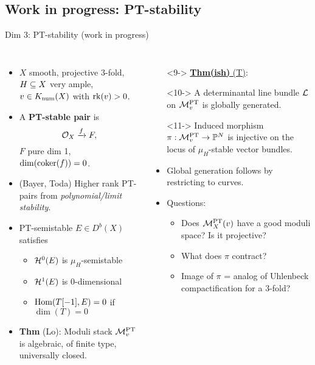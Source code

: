 \documentclass[8pt,handout]{beamer} %
\begin{document}
\subsection{Work in progress: PT-stability}
\begin{frame}{Dim 3: PT-stability (work in progress)}
    \begin{columns}[t]
        \begin{itemize}
            \item<2-> $X$ smooth, projective 3-fold, $H \subseteq X$ very ample, $v \in K_{\mathrm{num}}(X)$ with $\operatorname{\mathrm{rk}}(v) > 0$.
            \item<3-> A \textbf{PT-stable pair} is
            \[ \mathcal{O}_X \xrightarrow{f} F, \]
            $F$ pure dim 1, $\dim(\operatorname{\mathrm{coker}}(f)) = 0$.
            \item<4-> (Bayer, Toda) Higher rank PT-pairs from \textit{polynomial/limit stability}. 
            \item<5-> PT-semistable $E \in D^b(X)$ satisfies
            \begin{itemize}
                \item<6-> $\mathcal{H}^0(E)$ is $\mu_H$-semistable
                \item<6-> $\mathcal{H}^1(E)$ is 0-dimensional
                \item<7-> $\mathrm{Hom}(T[-1], E) = 0$ if $\dim(T) = 0$
            \end{itemize}
            \item<8-> \textbf{Thm} (Lo): Moduli stack $\mathcal{M}^{\text{PT}}_v$ is algebraic, of finite type, universally closed.
        \end{itemize}
        
        \begin{itemize}
            \item[]<9-> \underline{\textbf{Thm(ish)} (T)}: 
                \item[]<10-> A determinantal line bundle $\mathcal{L}$ on $\mathcal{M}^{\text{PT}}_v$ is globally generated.
                \item[]<11-> Induced morphism $\pi: \mathcal{M}^{\text{PT}}_v \to \mathbb{P}^N$ is injective on the locus of $\mu_H$-stable vector bundles.
            \item[]
            \item<12-> Global generation follows by restricting to curves.
            \item<13-> Questions:
            \begin{itemize}
                \item<14-> Does $\mathcal{M}^{\text{PT}}_X(v)$ have a good moduli space? Is it projective?
                \item<15-> What does $\pi$ contract?
                \item<16-> Image of $\pi$ = analog of Uhlenbeck compactification for a 3-fold?
            \end{itemize}
            
        \end{itemize}
    \end{columns}
\end{frame}
\end{document}
